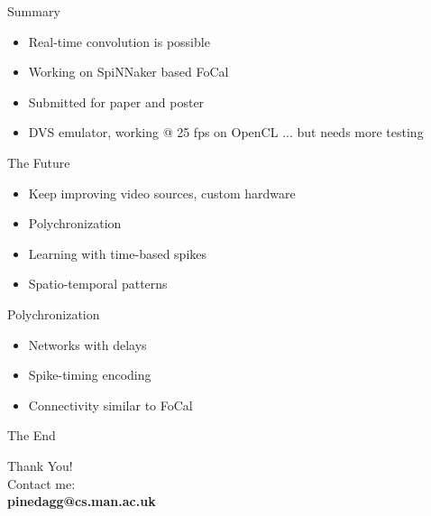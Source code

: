 \documentclass[17pt,mathserif]{beamer}
\begin{document}
    \begin{frame}{Summary}
        \vspace*{-3em}
        \begin{itemize}
          \item Real-time convolution is possible
          \item Working on SpiNNaker based FoCal
          \item Submitted for paper and poster
          \item DVS emulator, working @ 25 fps on OpenCL ... but needs more testing
        \end{itemize}
    \end{frame}

    \begin{frame}{The Future}
      \vspace*{-3em}
      \begin{itemize}
        \item Keep improving video sources, custom hardware
        \item Polychronization
        \item Learning with time-based spikes
        \item Spatio-temporal patterns
      \end{itemize}
    \end{frame}

    \begin{frame}{Polychronization}
      \vspace*{-3em}
      \begin{itemize}
        \item Networks with delays
        \item Spike-timing encoding
        \item Connectivity similar to FoCal
      \end{itemize}
    \end{frame}


   \begin{frame}{The End}
    \begin{center}
        \vspace*{-3em}
        {\Large Thank You!}\\
        \vspace*{0.5em}
        Contact me:\\[1em]
        {\Large \textbf{pinedagg@cs.man.ac.uk}}\\
    \end{center}
  \end{frame}
        
\end{document}

